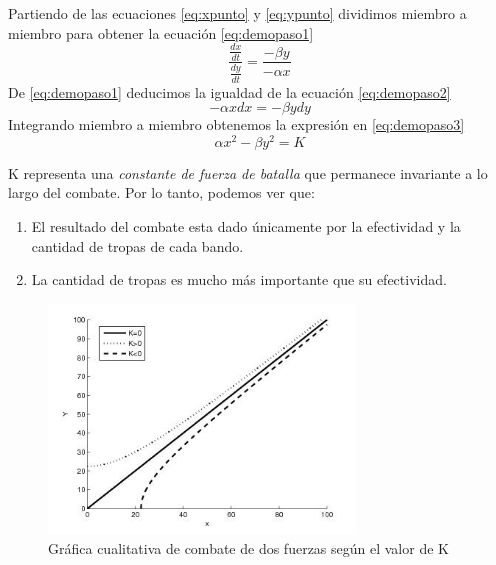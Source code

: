 \documentclass[10pt,journal,compsoc]{IEEEtran}
\begin{document}
Partiendo de las ecuaciones {\ref{eq:xpunto}} y {\ref{eq:ypunto}}
dividimos miembro a miembro para obtener la ecuaci\'on {\ref{eq:demopaso1}}
\begin{equation}
\label{eq:demopaso1}
\frac{\frac{dx}{dt}}{\frac{dy}{dt}} = \frac{-\beta y}{-\alpha x}
\end{equation}
De {\ref{eq:demopaso1}} deducimos la igualdad de la ecuaci\'on {\ref{eq:demopaso2}}
\begin{equation}
\label{eq:demopaso2}
-\alpha x dx = -\beta y dy
\end{equation}
Integrando miembro a miembro obtenemos la expresi\'on en {\ref{eq:demopaso3}}
\begin{equation}
\label{eq:demopaso3}
\alpha x^2 - \beta y^2 = K
\end{equation}

K representa una \emph{constante de fuerza de batalla} que permanece
invariante a lo largo del combate. Por lo tanto, podemos ver
que:

\begin{enumerate}
 \item  El resultado del combate esta dado \'unicamente por la efectividad y la cantidad de tropas de cada bando.
 \item  La cantidad de tropas es mucho m\'as importante que su efectividad.
\end{enumerate}


\begin{figure}[t]
\label{fig:grafico_k}
\centering
\includegraphics[width=3.2in]{grafico_k}
\caption{Gr\'afica cualitativa de combate de dos fuerzas seg\'un el valor de K}
\end{figure}
\end{document}
